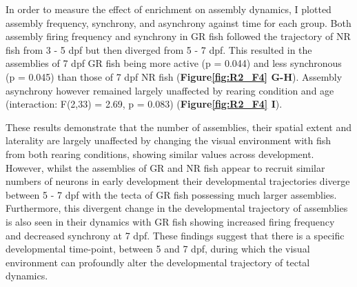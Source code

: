  In order to measure the effect of enrichment on assembly dynamics, I plotted assembly frequency, synchrony, and asynchrony against time for each group. Both assembly firing frequency and synchrony in GR fish followed the trajectory of NR fish from 3 - 5 \gls{dpf} but then diverged from 5 - 7 \gls{dpf}. This resulted in the assemblies of 7 \gls{dpf} GR fish being more active (p = 0.044) and less synchronous (p = 0.045) than those of 7 \gls{dpf} NR fish (\textbf{Figure\ref{fig:R2_F4} G-H}). Assembly asynchrony  however remained largely unaffected by rearing condition and age (interaction:  F(2,33) = 2.69, p = 0.083) (\textbf{Figure\ref{fig:R2_F4} I}).

These results demonstrate that the number of assemblies, their spatial extent and laterality are largely unaffected by changing the visual environment with fish from both rearing conditions, showing similar values across development. However, whilst the assemblies of GR and NR fish appear to recruit similar numbers of neurons in early development their developmental trajectories diverge between 5 - 7 \gls{dpf} with the tecta of GR fish possessing much larger assemblies. Furthermore, this divergent change in the developmental trajectory of assemblies is also seen in their dynamics with GR fish showing increased firing frequency and decreased synchrony at 7 \gls{dpf}. These findings suggest that there is a specific developmental time-point, between 5 and 7 \gls{dpf}, during which the visual environment can profoundly alter the developmental trajectory of tectal dynamics.

